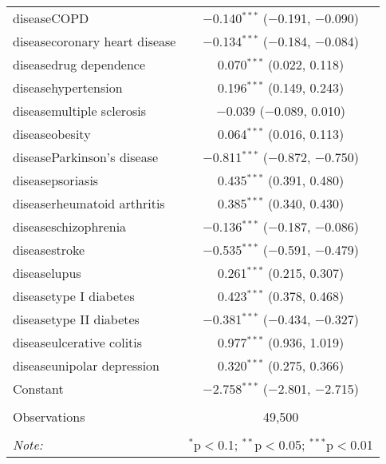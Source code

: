 \begin{table}[!htbp]
\begin{tabular}{@{\extracolsep{5pt}}lc}
  diseaseCOPD & $-$0.140$^{***}$ ($-$0.191, $-$0.090) \\ 
  diseasecoronary heart disease & $-$0.134$^{***}$ ($-$0.184, $-$0.084) \\ 
  diseasedrug dependence & 0.070$^{***}$ (0.022, 0.118) \\ 
  diseasehypertension & 0.196$^{***}$ (0.149, 0.243) \\ 
  diseasemultiple sclerosis & $-$0.039 ($-$0.089, 0.010) \\ 
  diseaseobesity & 0.064$^{***}$ (0.016, 0.113) \\ 
  diseaseParkinson's disease & $-$0.811$^{***}$ ($-$0.872, $-$0.750) \\ 
  diseasepsoriasis & 0.435$^{***}$ (0.391, 0.480) \\ 
  diseaserheumatoid arthritis & 0.385$^{***}$ (0.340, 0.430) \\ 
  diseaseschizophrenia & $-$0.136$^{***}$ ($-$0.187, $-$0.086) \\ 
  diseasestroke & $-$0.535$^{***}$ ($-$0.591, $-$0.479) \\ 
  diseaselupus & 0.261$^{***}$ (0.215, 0.307) \\ 
  diseasetype I diabetes & 0.423$^{***}$ (0.378, 0.468) \\ 
  diseasetype II diabetes & $-$0.381$^{***}$ ($-$0.434, $-$0.327) \\ 
  diseaseulcerative colitis & 0.977$^{***}$ (0.936, 1.019) \\ 
  diseaseunipolar depression & 0.320$^{***}$ (0.275, 0.366) \\ 
  Constant & $-$2.758$^{***}$ ($-$2.801, $-$2.715) \\ 
 \hline \\[-1.8ex] 
Observations & 49,500 \\ 
\hline 
\hline \\[-1.8ex] 
\textit{Note:}  & \multicolumn{1}{r}{$^{*}$p$<$0.1; $^{**}$p$<$0.05; $^{***}$p$<$0.01} \\ 
\end{tabular} 
\end{table} 

